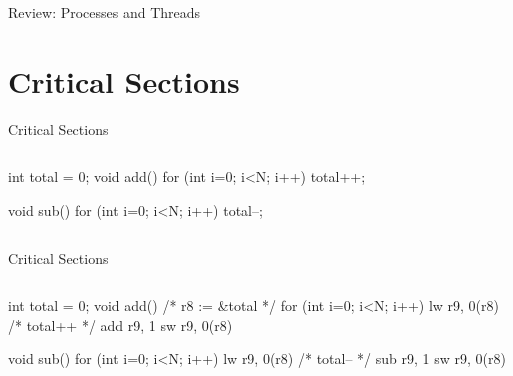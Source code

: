 \documentclass[11pt,aspectratio=169]{beamer}
\subtitle{Lecture 4: Concurrency}
\begin{document}
\maketitle

\begin{slide}{Review: Processes and Threads}
\end{slide}

\section{Critical Sections}

\begin{slide}{Critical Sections}
\begin{columns}
    \begin{ccode}
int total = 0;
void add() {
    for (int i=0; i<N; i++) {
	total++;
    }
}

void sub() {
    for (int i=0; i<N; i++) {
	total--;
    }
}
    \end{ccode}
\end{columns}
\end{slide}

\begin{slide}{Critical Sections}
\begin{columns}
    \begin{ccode}
int total = 0;
void add() {
    /* r8 := &total */
    for (int i=0; i<N; i++) {
	lw r9, 0(r8) /* total++ */
	add r9, 1
	sw r9, 0(r8)
    }
}

void sub() {
    for (int i=0; i<N; i++) {
	lw r9, 0(r8) /* total-- */
	sub r9, 1
	sw r9, 0(r8)
    }
}
    \end{ccode}
\end{columns}
\end{slide}
\end{document}
